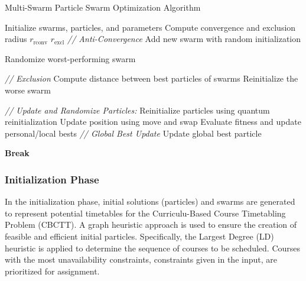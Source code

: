 \begin{algorithm}[H]
    \small
    \caption{Multi-Swarm Particle Swarm Optimization Algorithm}
    \begin{algorithmic}[1]
    \State Initialize swarms, particles, and parameters
        \State Compute convergence and exclusion radius $r_\text{rconv} $ $r_\text{excl}$
        \State \textit{// Anti-Convergence}
            \State Add new swarm with random initialization
        \EndIf 

            \State Randomize worst-performing swarm
        \EndIf

        \State \textit{// Exclusion}
            \State Compute distance between best particles of swarms
                \State Reinitialize the worse swarm
            \EndIf
        \EndFor

        \State \textit{// Update and Randomize Particles:}
                \State Reinitialize particles using quantum reinitialization
            \Else
                \State Update position using move and swap
                \State Evaluate fitness and update personal/local bests
            \EndFor
            \EndIf
        \EndFor
        \State \textit{// Global Best Update}
            \State Update global best particle
        \EndIf
        
            \State \textbf{Break}
        \EndIf
    \EndFor
\end{algorithmic}
\end{algorithm}
    
\subsubsection{Initialization Phase}
\label{subsubsec:initialization}

In the initialization phase, initial solutions (particles) and swarms are generated to represent potential timetables for the Curriculu-Based Course Timetabling Problem (CBCTT). A graph heuristic approach \cite{mohamed2020constructing} is used to ensure the creation of feasible and efficient initial particles. Specifically, the Largest Degree (LD) heuristic is applied to determine the sequence of courses to be scheduled. Courses with the most unavailability constraints, constraints given in the input, are prioritized for assignment.

